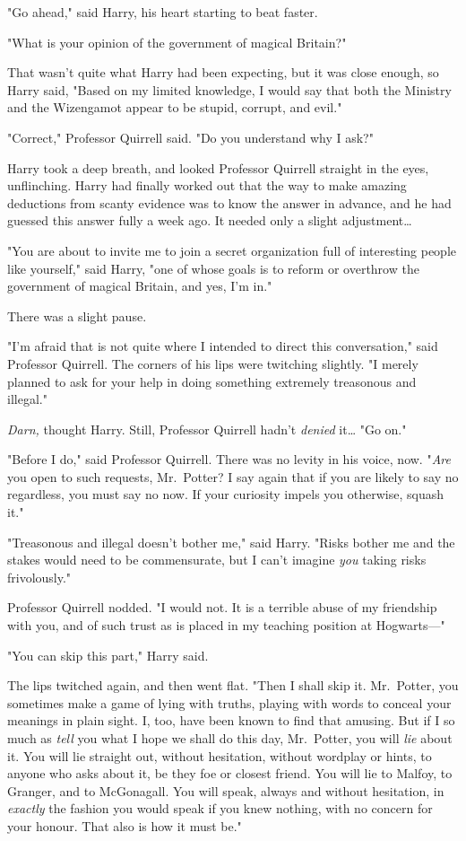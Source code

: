"Go ahead," said Harry, his heart starting to beat faster.

"What is your opinion of the government of magical Britain?"

That wasn't quite what Harry had been expecting, but it was close enough, so
Harry said, "Based on my limited knowledge, I would say that both the Ministry
and the Wizengamot appear to be stupid, corrupt, and evil."

"Correct," Professor Quirrell said. "Do you understand why I ask?"

Harry took a deep breath, and looked Professor Quirrell straight in the eyes,
unflinching. Harry had finally worked out that the way to make amazing
deductions from scanty evidence was to know the answer in advance, and he had
guessed this answer fully a week ago. It needed only a slight adjustment{\ldots}

"You are about to invite me to join a secret organization full of interesting
people like yourself," said Harry, "one of whose goals is to reform or
overthrow the government of magical Britain, and yes, I'm in."

There was a slight pause.

"I'm afraid that is not quite where I intended to direct this conversation,"
said Professor Quirrell. The corners of his lips were twitching slightly. "I
merely planned to ask for your help in doing something extremely treasonous and
illegal."

\emph{Darn,} thought Harry. Still, Professor Quirrell hadn't \emph{denied}
it{\ldots} "Go on."

"Before I do," said Professor Quirrell. There was no levity in his voice, now.
"\emph{Are} you open to such requests, Mr.~Potter? I say again that if you are
likely to say no regardless, you must say no now. If your curiosity impels you
otherwise, squash it."

"Treasonous and illegal doesn't bother me," said Harry. "Risks bother me and
the stakes would need to be commensurate, but I can't imagine \emph{you} taking
risks frivolously."

Professor Quirrell nodded. "I would not. It is a terrible abuse of my
friendship with you, and of such trust as is placed in my teaching position at
Hogwarts---"

"You can skip this part," Harry said.

The lips twitched again, and then went flat. "Then I shall skip it. Mr.~Potter,
you sometimes make a game of lying with truths, playing with words to conceal
your meanings in plain sight. I, too, have been known to find that amusing. But
if I so much as \emph{tell} you what I hope we shall do this day, Mr.~Potter,
you will \emph{lie} about it. You will lie straight out, without hesitation,
without wordplay or hints, to anyone who asks about it, be they foe or closest
friend. You will lie to Malfoy, to Granger, and to McGonagall. You will speak,
always and without hesitation, in \emph{exactly} the fashion you would speak if
you knew nothing, with no concern for your honour. That also is how it must be."

